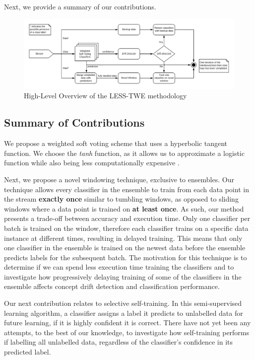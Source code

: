 Next, we provide a summary of our contributions.

\begin{figure}
  \includegraphics[width=\linewidth]{./images/chapter3/prequential_loop}
\caption{\label{fig:prequential_loop}High-Level Overview of the LESS-TWE methodology}
\end{figure}

\subsection{Summary of Contributions}

We propose a weighted soft voting scheme that uses a hyperbolic tangent function. We choose the \textit{tanh} function, as it allows us to approximate a logistic function while also being less computationally expensive \citep[10]{lecun2012efficient}.

Next, we propose a novel windowing technique, exclusive to ensembles. Our technique allows every classifier in the ensemble to train from each data point in the stream \textbf{exactly once} similar to tumbling windows, as opposed to sliding windows where a data point is trained on \textbf{at least once}. As such, our method presents a trade-off between accuracy and execution time. Only one classifier per batch is trained on the window, therefore each classifier trains on a specific data instance at different times, resulting in delayed training. This means that only one classifier in the ensemble is trained on the newest data before the ensemble predicts labels for the subsequent batch.
The motivation for this technique is to determine if we can spend less execution time training the classifiers and to investigate how progressively delaying training of some of the classifiers in the ensemble affects concept drift detection and classification performance.

Our next contribution relates to selective self-training. In this semi-supervised learning algorithm, a classifier assigns a label it predicts to unlabelled data for future learning, if it is highly confident it is correct. There have not yet been any attempts, to the best of our knowledge, to investigate how self-training performs if labelling all unlabelled data, regardless of the classifier's confidence in its predicted label.

